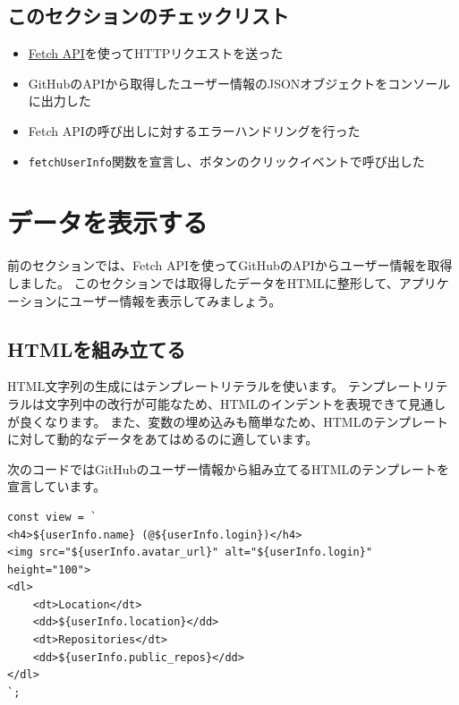 \hypertarget{section-checklist}{%
\subsection{このセクションのチェックリスト}\label{section-checklist}}

\begin{itemize}
\item
  \href{https://developer.mozilla.org/ja/docs/Web/API/Fetch_API}{Fetch
  API}を使ってHTTPリクエストを送った
\item
  GitHubのAPIから取得したユーザー情報のJSONオブジェクトをコンソールに出力した
\item
  Fetch APIの呼び出しに対するエラーハンドリングを行った
\item
  \texttt{fetchUserInfo}関数を宣言し、ボタンのクリックイベントで呼び出した
\end{itemize}

\hypertarget{display-data}{%
\section{データを表示する}\label{display-data}}

前のセクションでは、Fetch
APIを使ってGitHubのAPIからユーザー情報を取得しました。
このセクションでは取得したデータをHTMLに整形して、アプリケーションにユーザー情報を表示してみましょう。

\hypertarget{markup-html}{%
\subsection{HTMLを組み立てる}\label{markup-html}}

HTML文字列の生成にはテンプレートリテラルを使います。
テンプレートリテラルは文字列中の改行が可能なため、HTMLのインデントを表現できて見通しが良くなります。
また、変数の埋め込みも簡単なため、HTMLのテンプレートに対して動的なデータをあてはめるのに適しています。

次のコードではGitHubのユーザー情報から組み立てるHTMLのテンプレートを宣言しています。

\begin{lstlisting}
const view = `
<h4>${userInfo.name} (@${userInfo.login})</h4>
<img src="${userInfo.avatar_url}" alt="${userInfo.login}" height="100">
<dl>
    <dt>Location</dt>
    <dd>${userInfo.location}</dd>
    <dt>Repositories</dt>
    <dd>${userInfo.public_repos}</dd>
</dl>
`;
\end{lstlisting}

